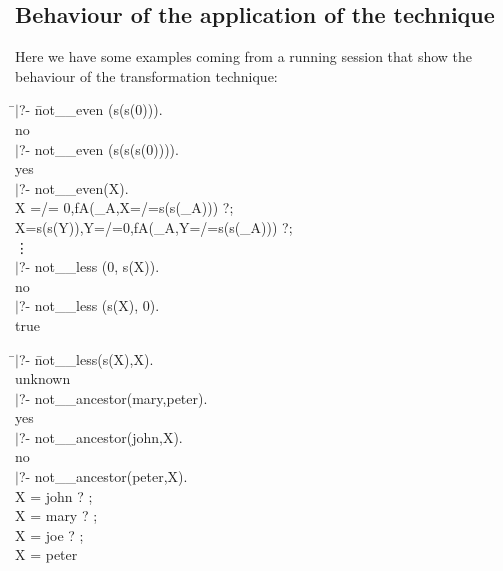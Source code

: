 \documentclass[]{llncs}
\newenvironment{mytabbing}
   {\vspace{0.3em}\begin{small}\begin{tabbing}}
   {\end{tabbing}\end{small}\vspace{0.3em}}
\begin{document}
\subsection{Behaviour of the application of the technique}
Here we have some examples coming from a running session that
show the behaviour of the transformation technique:

\begin{small}
\begin{tt}
\begin{minipage}[h]{10cm}
\begin{mytabbing}
\=$|$?- \=not\_\_even (s(s(0))). \\
    \>      \>no \\
\>$|$?- not\_\_even (s(s(s(0)))). \\
    \>      \>yes \\
\>$|$?- not\_\_even(X). \\
    \>      \>X =/= 0,fA(\_A,X=/=s(s(\_A))) ?;\\
    \>      \>X=s(s(Y)),Y=/=0,fA(\_A,Y=/=s(s(\_A))) ?; \\
    \>      \> \vdots \\
\>$|$?- not\_\_less (0, s(X)). \\
    \>      \>no \\
\>$|$?- not\_\_less (s(X), 0). \\
    \>      \>true 
\end{mytabbing}
\end{minipage}
\begin{minipage}[h]{7.3cm}
\begin{mytabbing}
\=$|$?- \=not\_\_less(s(X),X). \\
    \>      \>unknown \\
\>$|$?- not\_\_ancestor(mary,peter).\\
    \>      \>yes \\
\>$|$?- not\_\_ancestor(john,X). \\
    \>      \>no \\
\>$|$?- not\_\_ancestor(peter,X). \\
    \>      \>X = john ? ; \\
    \>      \>X = mary ? ; \\
    \>      \>X = joe ? ; \\
    \>      \>X = peter 
\end{mytabbing}
\end{minipage}
\end{tt}
\end{small}
\end{document}
